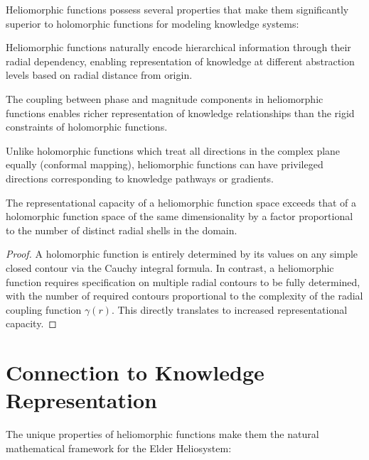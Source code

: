 Heliomorphic functions possess several properties that make them significantly superior to holomorphic functions for modeling knowledge systems:

\begin{proposition}
Heliomorphic functions naturally encode hierarchical information through their radial dependency, enabling representation of knowledge at different abstraction levels based on radial distance from origin.
\end{proposition}

\begin{proposition}
The coupling between phase and magnitude components in heliomorphic functions enables richer representation of knowledge relationships than the rigid constraints of holomorphic functions.
\end{proposition}

\begin{proposition}
Unlike holomorphic functions which treat all directions in the complex plane equally (conformal mapping), heliomorphic functions can have privileged directions corresponding to knowledge pathways or gradients.
\end{proposition}

\begin{theorem}
The representational capacity of a heliomorphic function space exceeds that of a holomorphic function space of the same dimensionality by a factor proportional to the number of distinct radial shells in the domain.
\end{theorem}

\begin{proof}
A holomorphic function is entirely determined by its values on any simple closed contour via the Cauchy integral formula. In contrast, a heliomorphic function requires specification on multiple radial contours to be fully determined, with the number of required contours proportional to the complexity of the radial coupling function $\gamma(r)$. This directly translates to increased representational capacity.
\end{proof}

\section{Connection to Knowledge Representation}

The unique properties of heliomorphic functions make them the natural mathematical framework for the Elder Heliosystem:

